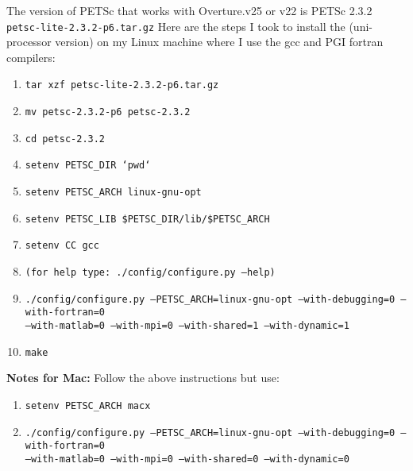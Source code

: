\documentclass{article}
\begin{document}
The version of PETSc that works
with Overture.v25 or v22 is PETSc 2.3.2 \texttt{petsc-lite-2.3.2-p6.tar.gz}
Here are the steps I took to install the (uni-processor version)
on my Linux machine where I use the gcc and PGI fortran compilers:
\begin{enumerate}
   \item {\tt tar xzf petsc-lite-2.3.2-p6.tar.gz}
   \item {\tt mv petsc-2.3.2-p6 petsc-2.3.2}
   \item {\tt cd petsc-2.3.2}
   \item {\tt setenv PETSC\_DIR `pwd`}
   \item {\tt setenv PETSC\_ARCH linux-gnu-opt}
   \item {\tt setenv PETSC\_LIB \$PETSC\_DIR/lib/\$PETSC\_ARCH}
   \item {\tt setenv CC gcc}
   \item {\tt (for help type: ./config/configure.py --help)}
   \item {\tt ./config/configure.py  --PETSC\_ARCH=linux-gnu-opt --with-debugging=0 --with-fortran=0 \\    
                              --with-matlab=0 --with-mpi=0 --with-shared=1 --with-dynamic=1}
   \item {\tt make}
\end{enumerate}

{\bf Notes for Mac:} Follow the above instructions but use:
\begin{enumerate}
   \item {\tt setenv PETSC\_ARCH macx}
   \item {\tt ./config/configure.py  --PETSC\_ARCH=linux-gnu-opt --with-debugging=0 --with-fortran=0 \\    
                              --with-matlab=0 --with-mpi=0 --with-shared=0 --with-dynamic=0}
\end{enumerate}


\end{document}

